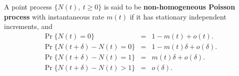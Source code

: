 \documentclass[a4paper,10pt,english]{article}
\begin{document}
\begin{defn}\label{defn:NonHomogeneousPoisson} A point process $\{N(t),~t\geqslant 0\}$ is said to be \textbf{non-homogeneous Poisson process} with instantaneous rate $m(t)$ if it has stationary independent increments, and 
 \begin{eqnarray*}\label{eq:NonHomogeneousPoisson}
 \Pr\{N(t)=0\}&=&1-m(t)+o(t). \\
  \Pr\{N(t+\delta)-N(t)=0\} &=& 1-m(t)\delta+o(\delta). \\
   \Pr\{N(t+\delta)-N(t)=1\} &=& m(t)\delta+o(\delta). \\
   \Pr\{N(t+\delta)-N(t)>1\} &=& o(\delta). \\
   \end{eqnarray*}
\end{defn}
\end{document}
